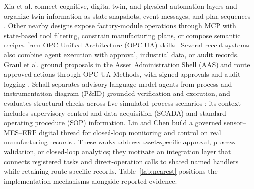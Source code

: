 Xia et al. connect cognitive, digital-twin, and physical-automation layers and
organize twin information as state snapshots, event messages, and plan
sequences \cite{xia2025architecture}. Other nearby designs expose factory-module
operations through MCP with state-based tool filtering, constrain
manufacturing plans, or compose semantic recipes from OPC Unified Architecture
(OPC UA) skills
\cite{koehle2026llmdriven,silva2025mcpmanufacturing,koehle2025semanticrecipes}.
Several recent systems also combine agent execution with approval, industrial
data, or audit records. Graul et al. ground proposals in the Asset
Administration Shell (AAS) and route approved actions through OPC UA Methods,
with signed approvals and audit logging \cite{graul2026aas}. Schall separates
advisory language-model agents from process and instrumentation diagram
(P\&ID)-grounded verification and execution, and evaluates structural checks
across five simulated process scenarios \cite{schall2026safe}; its context
includes supervisory control and data acquisition (SCADA) and standard
operating procedure (SOP) information. Lin and Chen build a governed
sensor--MES--ERP digital thread for closed-loop monitoring and control on real
manufacturing records \cite{lin2026agentic}. These works address asset-specific approval, process validation, or
closed-loop analytics; they motivate an integration layer that connects
registered tasks and direct-operation calls to shared named handlers while
retaining route-specific records. Table~\ref{tab:nearest} positions the
implementation mechanisms alongside reported evidence.
